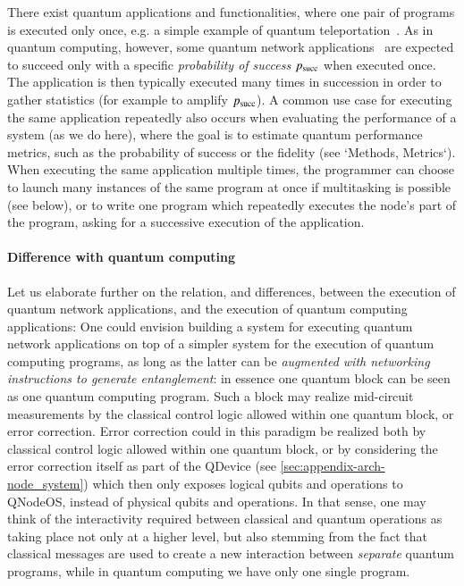 There exist quantum applications and functionalities, where one pair of programs is executed only once, e.g. a simple example of quantum teleportation~\cite{bennett_1993_teleportation}. As in quantum computing, however, some quantum network applications~\cite{wehner_2018_stages} are expected to succeed only with a specific \emph{probability of success} $p_{\rm succ}$ when executed once. The application is then typically executed many times in succession in order to gather statistics (for example to amplify $p_{\rm succ}$). A common use case for executing the same application repeatedly also occurs when evaluating the performance of a system (as we do here), where the goal is to estimate quantum performance metrics, such as the probability of success or the fidelity (see `Methods, Metrics`).
When executing the same application multiple times, the programmer can choose to launch many instances of the same program at once if multitasking is possible (see below), or to write one program which repeatedly executes the node's part of the program, asking for a successive execution of the application.

\paragraph{Difference with quantum computing}

Let us elaborate further on the relation, and differences, between the execution of quantum network applications, and the execution of quantum computing applications: One could envision building a system for executing quantum network applications on top of a simpler system for the execution of quantum computing programs, as long as the latter can be \emph{augmented with networking instructions to generate entanglement}: in essence one quantum block can be seen as one quantum computing program. Such a block may realize mid-circuit measurements by the classical control logic allowed within one quantum block, or error correction. Error correction could in this paradigm be realized both by classical control logic allowed within one quantum block, or by considering the error correction itself as part of the \ac{QDevice} (see \cref{sec:appendix-arch-node_system}) which then only exposes logical qubits and operations to \ac{QNodeOS}, instead of physical qubits and operations. In that sense, one may think of the interactivity required between classical and quantum operations as taking place not only at a higher level, but also stemming from the fact that classical messages are used to create a new interaction between \emph{separate} quantum programs, while in quantum computing we have only one single program.

